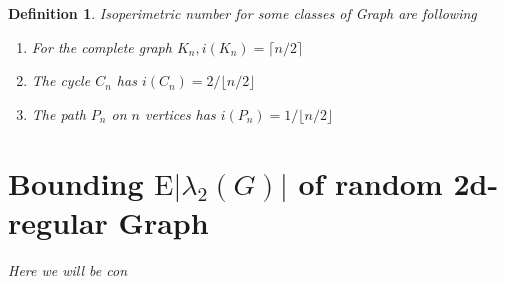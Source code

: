 \documentclass[oneside]{book}
\newtheorem{mydef}{Definition}
\begin{document}
\begin{mydef}
           
          
         
        Isoperimetric number for some classes of Graph are following \par
       \begin{enumerate}
            \item   For the complete graph $K_{n}, i\left(K_{n}\right)=\lceil n / 2\rceil$ \par
            \item The cycle $C_{n}$ has $i\left(C_{n}\right)=2 /\lfloor n / 2\rfloor$ \par
            \item  The path $P_{n}$ on $n$ vertices has $i\left(P_{n}\right)=1 /\lfloor n / 2\rfloor$
        \end{enumerate}
        \section{Bounding $\mathrm{E}\left|\lambda_{2}(G)\right|$ of random 2d-regular Graph}
        \label{s:6 }
        Here  we will be con
        

\end{mydef}
\end{document}
